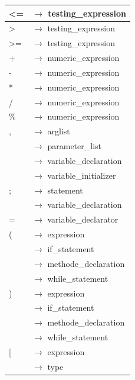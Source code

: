 \documentclass[10pt,a4paper,titlepage]{article}
\begin{document}
\begin{ttfamily}
\begin{tabular}{| l  l |}
\hspace*{1cm}<= & $\to$ testing\_expression\\\hline
\hspace*{1cm}> & $\to$ testing\_expression\\\hline
\hspace*{1cm}>= & $\to$ testing\_expression\\\hline
\hspace*{1cm}+ & $\to$ numeric\_expression\\\hline
\hspace*{1cm}- & $\to$ numeric\_expression\\\hline
\hspace*{1cm}* & $\to$ numeric\_expression\\\hline
\hspace*{1cm}/ & $\to$ numeric\_expression\\\hline
\hspace*{1cm}\% & $\to$ numeric\_expression\\\hline
\hspace*{1cm}, & $\to$ arglist \\
 & $\to$ parameter\_list \\
 & $\to$ variable\_declaration \\
 & $\to$ variable\_initializer\\\hline
\hspace*{1cm}; & $\to$ statement \\
 & $\to$ variable\_declaration\\\hline
\hspace*{1cm}= & $\to$ variable\_declarator\\\hline
\hspace*{1cm}( & $\to$ expression \\
 & $\to$ if\_statement \\
 & $\to$ methode\_declaration \\
 & $\to$ while\_statement\\\hline
\hspace*{1cm}) & $\to$ expression \\
 & $\to$ if\_statement \\
 & $\to$ methode\_declaration \hspace*{5cm}\\
 & $\to$ while\_statement\\\hline
\hspace*{1cm}[ & $\to$ expression \\
 & $\to$ type \\\hline

\end{tabular}
\end{ttfamily}
\end{document}
